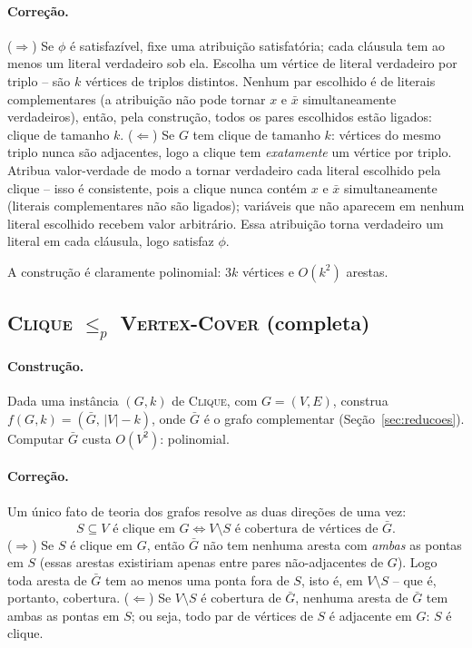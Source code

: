 \documentclass[9pt,a4paper]{extarticle}
\theoremstyle{definition}
\begin{document}
\paragraph{Correção.}
(\(\Rightarrow\)) Se \(\phi\) é satisfazível, fixe uma atribuição satisfatória; cada cláusula tem ao menos um literal verdadeiro sob ela. Escolha um vértice de literal verdadeiro por triplo -- são \(k\) vértices de triplos distintos. Nenhum par escolhido é de literais complementares (a atribuição não pode tornar \(x\) e \(\bar x\) simultaneamente verdadeiros), então, pela construção, todos os pares escolhidos estão ligados: clique de tamanho \(k\).
(\(\Leftarrow\)) Se \(G\) tem clique de tamanho \(k\): vértices do mesmo triplo nunca são adjacentes, logo a clique tem \emph{exatamente} um vértice por triplo. Atribua valor-verdade de modo a tornar verdadeiro cada literal escolhido pela clique -- isso é consistente, pois a clique nunca contém \(x\) e \(\bar x\) simultaneamente (literais complementares não são ligados); variáveis que não aparecem em nenhum literal escolhido recebem valor arbitrário. Essa atribuição torna verdadeiro um literal em cada cláusula, logo satisfaz \(\phi\).

A construção é claramente polinomial: \(3k\) vértices e \(O(k^2)\) arestas.

\subsection{\textsc{Clique} \(\leq_p\) \textsc{Vertex-Cover} (completa)}\label{sec:clique-vc}

\paragraph{Construção.} Dada uma instância \((G,k)\) de \textsc{Clique}, com \(G = (V,E)\), construa \(f(G,k) = (\bar G,\, |V|-k)\), onde \(\bar G\) é o grafo complementar (Seção~\ref{sec:reducoes}). Computar \(\bar G\) custa \(O(V^2)\): polinomial.

\paragraph{Correção.} Um único fato de teoria dos grafos resolve as duas direções de uma vez:
\[
S \subseteq V \text{ é clique em } G \iff V \setminus S \text{ é cobertura de vértices de } \bar G.
\]
(\(\Rightarrow\)) Se \(S\) é clique em \(G\), então \(\bar G\) não tem nenhuma aresta com \emph{ambas} as pontas em \(S\) (essas arestas existiriam apenas entre pares não-adjacentes de \(G\)). Logo toda aresta de \(\bar G\) tem ao menos uma ponta fora de \(S\), isto é, em \(V \setminus S\) -- que é, portanto, cobertura.
(\(\Leftarrow\)) Se \(V \setminus S\) é cobertura de \(\bar G\), nenhuma aresta de \(\bar G\) tem ambas as pontas em \(S\); ou seja, todo par de vértices de \(S\) é adjacente em \(G\): \(S\) é clique.
\end{document}

